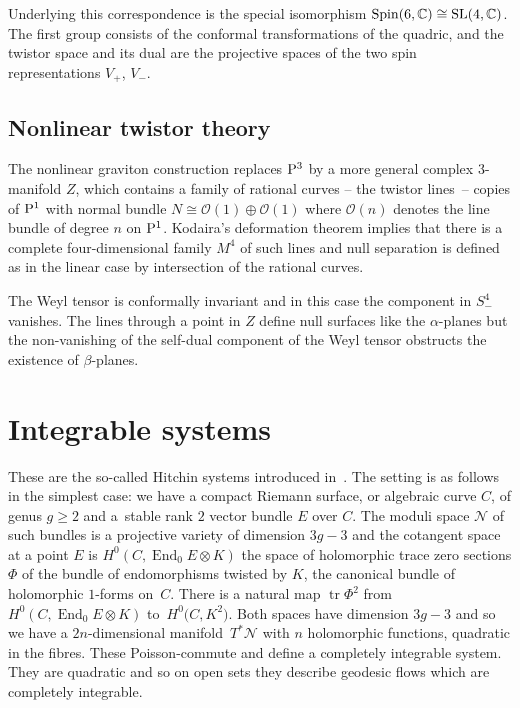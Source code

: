 \documentclass[10pt,a4paper]{amsart}
\numberwithin{equation}{section}
\begin{document}
Underlying this correspondence is the special isomorphism ${\rm Spin}(6,{\mathbb C})\cong {\rm SL}(4,{\mathbb C})$. The first group consists of the conformal transformations of the quadric, and the twistor space and its dual are the projective spaces of the two spin representations $V_+$, $V_-$.

\subsection{Nonlinear twistor theory} \label{graviton}
The nonlinear graviton construction \cite{Penrose} replaces ${\rm P}^3$ by a more general complex $3$-manifold $Z$, which contains a family of rational curves -- the twistor lines~-- copies of ${\rm P}^1$ with normal bundle $N\cong \mathcal{O}(1)\oplus \mathcal{O}(1)$ where $\mathcal{O}(n)$ denotes the line bundle of degree $n$ on ${\rm P}^1$. Kodaira's deformation theorem implies that there is a complete four-dimensional family $M^4$ of such lines and null separation is defined as in the linear case by intersection of the rational curves.

The Weyl tensor is conformally invariant and in this case the component in $S^4_-$ vanishes. The lines through a point in $Z$ define null surfaces like the $\alpha$-planes but the non-vanishing of the self-dual component of the Weyl tensor obstructs the existence of $\beta$-planes.

\section{Integrable systems}
These are the so-called Hitchin systems introduced in~\cite{Hitchin1987}. The setting is as follows in the simplest case: we have a compact Riemann surface, or algebraic curve $C$, of genus $g\ge 2$ and a~stable rank $2$ vector bundle $E$ over $C$. The moduli space ${\mathcal N}$ of such bundles is a projective variety of dimension $3g-3$ and the cotangent space at a point $E$ is $H^0(C,\operatorname{End}_0E\otimes K)$ the space of holomorphic trace zero sections $\Phi$ of the bundle of endomorphisms twisted by $K$, the canonical bundle of holomorphic $1$-forms on~$C$. There is a natural map $\operatorname{tr} \Phi^2$ from $H^0(C,\operatorname{End} _0E\otimes K)$ to~$H^0\big(C,K^2\big)$. Both spaces have dimension $3g-3$ and so we have a $2n$-dimensional mani\-fold~$T^*{\mathcal N}$ with $n$ holomorphic functions, quadratic in the fibres. These Poisson-commute and define a completely integrable system. They are quadratic and so on open sets they describe geodesic flows which are completely integrable.
\end{document}
